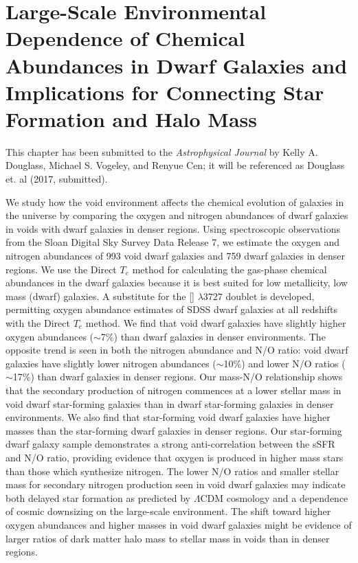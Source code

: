 \chapter[O$^+$ Approximation]{Large-Scale Environmental Dependence of Chemical Abundances in Dwarf Galaxies and Implications for Connecting Star Formation and Halo Mass}\label{ch:Paper3}


This chapter has been submitted to the \emph{Astrophysical Journal} by Kelly A. 
Douglass, Michael S. Vogeley, and Renyue Cen; it will be referenced as Douglass 
et. al (2017, submitted).



%
%
\begin{chapabstract}
We study how the void environment affects the chemical evolution of galaxies in 
the universe by comparing the oxygen and nitrogen abundances of dwarf galaxies 
in voids with dwarf galaxies in denser regions.  Using spectroscopic 
observations from the Sloan Digital Sky Survey Data Release 7, we estimate the 
oxygen and nitrogen abundances of 993 void dwarf galaxies and 759 dwarf galaxies 
in denser regions.  We use the Direct $T_e$ method for calculating the gas-phase 
chemical abundances in the dwarf galaxies because it is best suited for low 
metallicity, low mass (dwarf) galaxies.  A substitute for the [] 
$\lambda 3727$ doublet is developed, permitting oxygen abundance estimates of 
SDSS dwarf galaxies at all redshifts with the Direct $T_e$ method.  We find that 
void dwarf galaxies have slightly higher oxygen abundances ($\sim$7\%) than 
dwarf galaxies in denser environments.  The opposite trend is seen in both the 
nitrogen abundance and N/O ratio: void dwarf galaxies have slightly lower 
nitrogen abundances ($\sim$10\%) and lower N/O ratios ($\sim$17\%) than dwarf 
galaxies in denser regions.  Our mass-N/O relationship shows that the secondary 
production of nitrogen commences at a lower stellar mass in void dwarf 
star-forming galaxies than in dwarf star-forming galaxies in denser 
environments.  We also find that star-forming void dwarf galaxies have higher 
 masses than the star-forming dwarf galaxies in denser regions.  Our 
star-forming dwarf galaxy sample demonstrates a strong anti-correlation between 
the sSFR and N/O ratio, providing evidence that oxygen is produced in higher 
mass stars than those which synthesize nitrogen.  The lower N/O ratios and 
smaller stellar mass for secondary nitrogen production seen in void dwarf 
galaxies may indicate both delayed star formation as predicted by $\Lambda$CDM 
cosmology and a dependence of cosmic downsizing on the large-scale environment.  
The shift toward higher oxygen abundances and higher  masses in void 
dwarf galaxies might be evidence of larger ratios of dark matter halo mass to 
stellar mass in voids than in denser regions.
\end{chapabstract}


